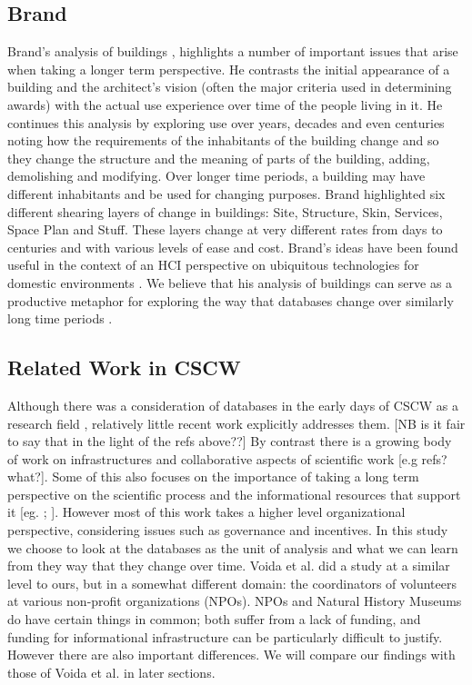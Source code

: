 \subsection{Brand}

Brand’s analysis of buildings \cite{brand1995buildings}, highlights a number of important issues that arise when taking a longer term perspective. He contrasts the initial appearance of a building and the architect’s vision (often the major criteria used in determining awards) with the actual use experience over time of the people living in it. He continues this analysis by exploring use over years, decades and even centuries noting how the requirements of the inhabitants of the building change and so they change the structure and the meaning of parts of the building, adding, demolishing and modifying. Over longer time periods, a building may have different inhabitants and be used for changing purposes. Brand highlighted six different shearing layers of change in buildings: Site, Structure, Skin, Services, Space Plan and Stuff. These layers change at very different rates from days to centuries and with various levels of ease and cost. Brand’s ideas have been found useful in the context of an HCI perspective on ubiquitous technologies for domestic environments \cite{rodden2003evolution}. We believe that his analysis of buildings can serve as a productive metaphor for exploring the way that databases change over similarly long time periods 
 \cite{thomer2014databases}. 
\subsection{Related Work in CSCW}
Although there was a consideration of databases in the early days of CSCW as a research field \cite{mariani1991impact}, relatively little recent work explicitly addresses them. [NB is it fair to say that in the light of the refs above??] By contrast there is a growing body of work on infrastructures and collaborative aspects of scientific work [e.g refs? what?]. Some of this also focuses  on the importance of taking a long term perspective on the scientific process and the informational resources that support it [eg. \cite{karasti2010infrastructure}; \cite{ribes2009long}]. However most of this work takes a higher level organizational perspective, considering issues such as governance and incentives. In this study we choose to look at the databases as the unit of analysis and what we can learn from they way that they change over time.  Voida et al. \cite{voida2011homebrew} did a study at a similar level to ours, but in a somewhat different domain:  the coordinators of volunteers at various non-profit organizations (NPOs). NPOs and Natural History Museums do have certain things in common; both suffer from a lack of funding, and  funding for informational infrastructure can be particularly difficult to justify. However there are also important differences. We will compare our findings with those of Voida et al. in later sections. 

